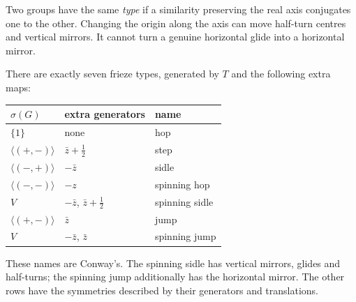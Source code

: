 Two groups have the same \emph{type} if a similarity preserving the real axis conjugates one to the other. Changing the origin along the axis can move half-turn centres and vertical mirrors. It cannot turn a genuine horizontal glide into a horizontal mirror.

\begin{theorem}\label{geometry:thm:friezes}
There are exactly seven frieze types, generated by $T$ and the following extra maps:
\begin{center}
\begin{tabular}{@{}lll@{}}
\hline
$\sigma(G)$ & extra generators & name\\
\hline
$\{1\}$ & none & hop\\
$\langle(+,-)\rangle$ & $\bar z+\frac12$ & step\\
$\langle(-,+)\rangle$ & $-\bar z$ & sidle\\
$\langle(-,-)\rangle$ & $-z$ & spinning hop\\
$V$ & $-\bar z$, $\bar z+\frac12$ & spinning sidle\\
$\langle(+,-)\rangle$ & $\bar z$ & jump\\
$V$ & $-\bar z$, $\bar z$ & spinning jump\\
\hline
\end{tabular}
\end{center}
These names are Conway's. The spinning sidle has vertical mirrors, glides and half-turns; the spinning jump additionally has the horizontal mirror. The other rows have the symmetries described by their generators and translations.
\end{theorem}
